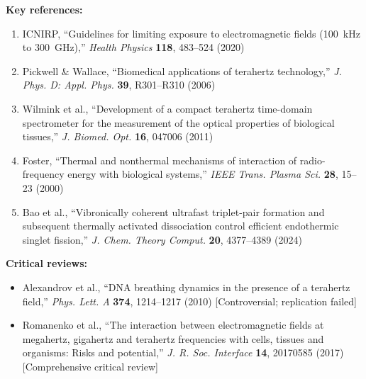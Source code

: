 \textbf{Key references:}
\begin{enumerate}
\item ICNIRP, ``Guidelines for limiting exposure to electromagnetic fields (100~kHz to 300~GHz),'' \textit{Health Physics} \textbf{118}, 483--524 (2020)
\item Pickwell \& Wallace, ``Biomedical applications of terahertz technology,'' \textit{J. Phys. D: Appl. Phys.} \textbf{39}, R301--R310 (2006)
\item Wilmink et al., ``Development of a compact terahertz time-domain spectrometer for the measurement of the optical properties of biological tissues,'' \textit{J. Biomed. Opt.} \textbf{16}, 047006 (2011)
\item Foster, ``Thermal and nonthermal mechanisms of interaction of radio-frequency energy with biological systems,'' \textit{IEEE Trans. Plasma Sci.} \textbf{28}, 15--23 (2000)
\item Bao et al., ``Vibronically coherent ultrafast triplet-pair formation and subsequent thermally activated dissociation control efficient endothermic singlet fission,'' \textit{J. Chem. Theory Comput.} \textbf{20}, 4377--4389 (2024)
\end{enumerate}

\textbf{Critical reviews:}
\begin{itemize}
\item Alexandrov et al., ``DNA breathing dynamics in the presence of a terahertz field,'' \textit{Phys. Lett. A} \textbf{374}, 1214--1217 (2010) [Controversial; replication failed]
\item Romanenko et al., ``The interaction between electromagnetic fields at megahertz, gigahertz and terahertz frequencies with cells, tissues and organisms: Risks and potential,'' \textit{J. R. Soc. Interface} \textbf{14}, 20170585 (2017) [Comprehensive critical review]
\end{itemize}
